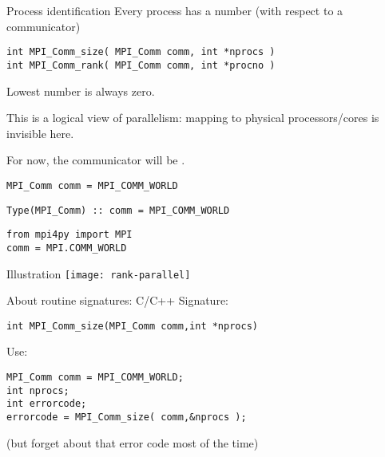 \begin{numberedframe}{Process identification}
  \label{sl:comm-world}
Every process has a number (with respect to a communicator)
\lstset{language=C}
\begin{lstlisting}
int MPI_Comm_size( MPI_Comm comm, int *nprocs )
int MPI_Comm_rank( MPI_Comm comm, int *procno )
\end{lstlisting}
Lowest number is always zero.

This is a logical view of parallelism: mapping to physical
processors/cores is invisible here.

For now, the communicator will be .

\lstset{language=C}
\begin{lstlisting}
MPI_Comm comm = MPI_COMM_WORLD
\end{lstlisting}

\lstset{language=Fortran}
\begin{lstlisting}
Type(MPI_Comm) :: comm = MPI_COMM_WORLD
\end{lstlisting}

\lstset{language=Python}
\begin{lstlisting}
from mpi4py import MPI
comm = MPI.COMM_WORLD
\end{lstlisting}

\lstset{language=C}
\end{numberedframe}

\begin{numberedframe}{Illustration}
  \texttt{[image: rank-parallel]}
\end{numberedframe}

\begin{numberedframe}{About routine signatures: C/C++}
  \label{sec:protos}
Signature:
\lstset{language=C}
\begin{lstlisting}
int MPI_Comm_size(MPI_Comm comm,int *nprocs)
\end{lstlisting}
Use:
\lstset{language=C}
\begin{lstlisting}
MPI_Comm comm = MPI_COMM_WORLD;
int nprocs;
int errorcode;
errorcode = MPI_Comm_size( comm,&nprocs );
\end{lstlisting}
(but forget about that error code most of the time)
\end{numberedframe}

